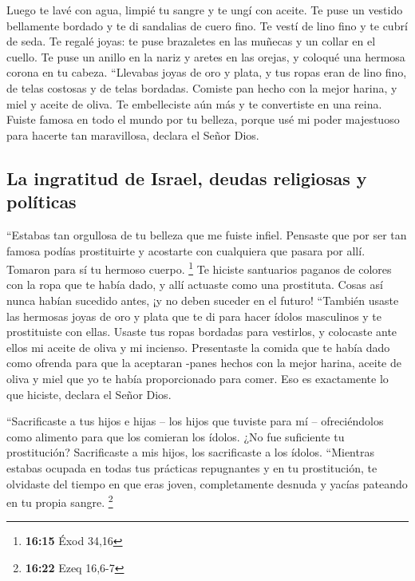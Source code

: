  Luego te lavé con agua, limpié tu sangre y te ungí con
aceite.  Te puse un vestido bellamente bordado y te di
sandalias de cuero fino. Te vestí de lino fino y te cubrí de seda.
 Te regalé joyas: te puse brazaletes en las muñecas y un
collar en el cuello.  Te puse un anillo en la nariz y
aretes en las orejas, y coloqué una hermosa corona en tu cabeza.
 ``Llevabas joyas de oro y plata, y tus ropas eran de
lino fino, de telas costosas y de telas bordadas. Comiste pan hecho con
la mejor harina, y miel y aceite de oliva. Te embelleciste aún más y te
convertiste en una reina.  Fuiste famosa en todo el mundo
por tu belleza, porque usé mi poder majestuoso para hacerte tan
maravillosa, declara el Señor Dios.

\hypertarget{la-ingratitud-de-israel-deudas-religiosas-y-poluxedticas}{%
\subsection{La ingratitud de Israel, deudas religiosas y
políticas}\label{la-ingratitud-de-israel-deudas-religiosas-y-poluxedticas}}

 ``Estabas tan orgullosa de tu belleza que me fuiste
infiel. Pensaste que por ser tan famosa podías prostituirte y acostarte
con cualquiera que pasara por allí. Tomaron para sí tu hermoso cuerpo.
\footnote{\textbf{16:15} Éxod 34,16}  Te hiciste
santuarios paganos de colores con la ropa que te había dado, y allí
actuaste como una prostituta. Cosas así nunca habían sucedido antes, ¡y
no deben suceder en el futuro!  ``También usaste las
hermosas joyas de oro y plata que te di para hacer ídolos masculinos y
te prostituiste con ellas.  Usaste tus ropas bordadas
para vestirlos, y colocaste ante ellos mi aceite de oliva y mi incienso.
 Presentaste la comida que te había dado como ofrenda
para que la aceptaran -panes hechos con la mejor harina, aceite de oliva
y miel que yo te había proporcionado para comer. Eso es exactamente lo
que hiciste, declara el Señor Dios.

 ``Sacrificaste a tus hijos e hijas -- los hijos que
tuviste para mí -- ofreciéndolos como alimento para que los comieran los
ídolos. ¿No fue suficiente tu prostitución?  Sacrificaste
a mis hijos, los sacrificaste a los ídolos.  ``Mientras
estabas ocupada en todas tus prácticas repugnantes y en tu prostitución,
te olvidaste del tiempo en que eras joven, completamente desnuda y
yacías pateando en tu propia sangre. \footnote{\textbf{16:22} Ezeq
  16,6-7}

